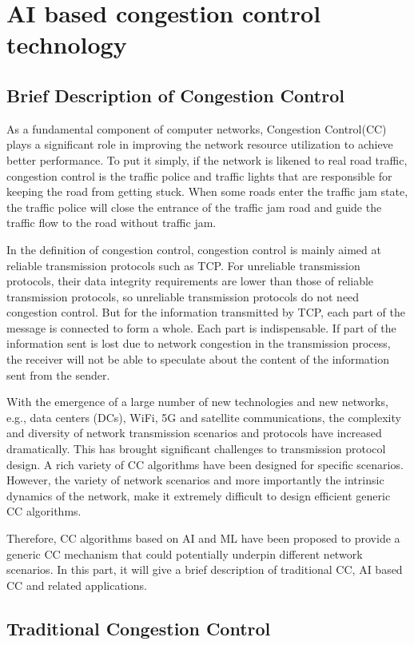 \documentclass[conference]{IEEEtran}
\begin{document}
\section{AI based congestion control technology}
\subsection{Brief Description of Congestion Control}
As a fundamental component of computer networks, Congestion Control(CC) plays a significant role in improving the network resource utilization to achieve better performance. To put it simply, if the network is likened to real road traffic, congestion control is the traffic police and traffic lights that are responsible for keeping the road from getting stuck. When some roads enter the traffic jam state, the traffic police will close the entrance of the traffic jam road and guide the traffic flow to the road without traffic jam. 

In the definition of congestion control, congestion control is mainly aimed at reliable transmission protocols such as TCP. For unreliable transmission protocols, their data integrity requirements are lower than those of reliable transmission protocols, so unreliable transmission protocols do not need congestion control. But for the information transmitted by TCP, each part of the message is connected to form a whole. Each part is indispensable. If part of the information sent is lost due to network congestion in the transmission process, the receiver will not be able to speculate about the content of the information sent from the sender.

With the emergence of a large number of new technologies and new networks, e.g., data centers (DCs), WiFi, 5G and satellite communications, the complexity and diversity of network transmission scenarios and protocols have increased dramatically. This has brought significant challenges to transmission protocol design. A rich variety of CC algorithms have been designed for specific scenarios. However, the variety of network scenarios and more importantly the intrinsic dynamics of the network, make it extremely difficult to design efficient generic CC algorithms.

Therefore, CC algorithms based on AI and ML have been proposed to provide a generic CC mechanism that could potentially underpin different network scenarios. In this part, it will give a brief description of traditional CC, AI based CC and related applications. 

\subsection{Traditional Congestion Control\cite{a4}}
\end{document}
